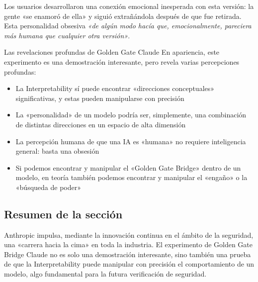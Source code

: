 Los usuarios desarrollaron una conexión emocional inesperada con esta versión: la gente «se enamoró de ella» y siguió extrañándola después de que fue retirada. Esta personalidad obsesiva \textit{«de algún modo hacía que, emocionalmente, pareciera más humana que cualquier otra versión»}.

\begin{knowledgebox}{Las revelaciones profundas de Golden Gate Claude}
En apariencia, este experimento es una demostración interesante, pero revela varias percepciones profundas:
\begin{itemize}
    \item La Interpretability sí puede encontrar «direcciones conceptuales» significativas, y estas pueden manipularse con precisión
    \item La «personalidad» de un modelo podría ser, simplemente, una combinación de distintas direcciones en un espacio de alta dimensión
    \item La percepción humana de que una IA es «humana» no requiere inteligencia general: basta una obsesión
    \item Si podemos encontrar y manipular el «Golden Gate Bridge» dentro de un modelo, en teoría también podemos encontrar y manipular el «engaño» o la «búsqueda de poder»
\end{itemize}
\end{knowledgebox}

\subsection{Resumen de la sección}

Anthropic impulsa, mediante la innovación continua en el ámbito de la seguridad, una «carrera hacia la cima» en toda la industria. El experimento de Golden Gate Bridge Claude no es solo una demostración interesante, sino también una prueba de que la Interpretability puede manipular con precisión el comportamiento de un modelo, algo fundamental para la futura verificación de seguridad.

